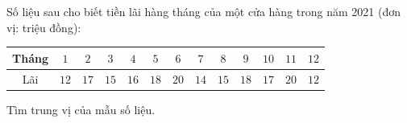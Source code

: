 \begin{ex}
Số liệu sau cho biết tiền lãi hàng tháng của một cửa hàng trong năm 2021 (đơn vị: triệu đồng):
\begin{center}
\begin{tabular}{|c|c|c|c|c|c|c|c|c|c|c|c|c|}\hline
Tháng & $1$ & $2$ & $3$ & $4$ & $5$ & $6$ & $7$ & $8$ & $9$ & $10$ & $11$ & $12$\\\hline
Lãi & $12$ & $17$ & $15$ & $16$ & $18$ & $20$ & $14$ & $15$ & $18$ & $17$ & $20$ & $12$\\\hline
\end{tabular}
\end{center}
Tìm trung vị của mẫu số liệu.
\end{ex}
